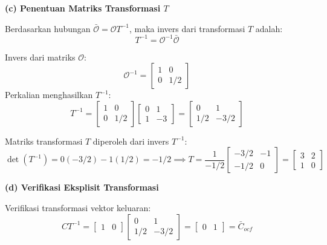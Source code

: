 \documentclass[11pt,a4paper]{article}
\begin{document}
\textbf{(c) Penentuan Matriks Transformasi $T$}

Berdasarkan hubungan $\bar{\mathcal{O}} = \mathcal{O} T^{-1}$, maka invers dari transformasi $T$ adalah:
$$T^{-1} = \mathcal{O}^{-1} \bar{\mathcal{O}}$$

Invers dari matriks $\mathcal{O}$:
$$\mathcal{O}^{-1} = \begin{bmatrix} 1 & 0 \\ 0 & 1/2 \end{bmatrix}$$
Perkalian menghasilkan $T^{-1}$:
$$T^{-1} = \begin{bmatrix} 1 & 0 \\ 0 & 1/2 \end{bmatrix} \begin{bmatrix} 0 & 1 \\ 1 & -3 \end{bmatrix} = \begin{bmatrix} 0 & 1 \\ 1/2 & -3/2 \end{bmatrix}$$

Matriks transformasi $T$ diperoleh dari invers $T^{-1}$:
$$\det(T^{-1}) = 0(-3/2) - 1(1/2) = -1/2 \implies T = \frac{1}{-1/2} \begin{bmatrix} -3/2 & -1 \\ -1/2 & 0 \end{bmatrix} = \begin{bmatrix} 3 & 2 \\ 1 & 0 \end{bmatrix}$$

\textbf{(d) Verifikasi Eksplisit Transformasi}

Verifikasi transformasi vektor keluaran:
$$C T^{-1} = \begin{bmatrix} 1 & 0 \end{bmatrix} \begin{bmatrix} 0 & 1 \\ 1/2 & -3/2 \end{bmatrix} = \begin{bmatrix} 0 & 1 \end{bmatrix} = \bar{C}_{ocf}$$
\end{document}

